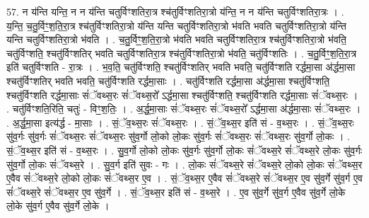 \documentclass[17pt]{extarticle}
\begin{document}
57. न य॑न्ति यन्ति॒ न न य॑न्ति चतुर्विꣳशतिरा॒त्र श्च॑तुर्विꣳशतिरा॒त्रो य॑न्ति॒ न न य॑न्ति चतुर्विꣳशतिरा॒त्रः । . य॒न्ति॒ च॒तु॒र्विꣳ॒॒श॒ति॒रा॒त्र श्च॑तुर्विꣳशतिरा॒त्रो य॑न्ति यन्ति चतुर्विꣳशतिरा॒त्रो भ॑वति भवति चतुर्विꣳशतिरा॒त्रो य॑न्ति यन्ति चतुर्विꣳशतिरा॒त्रो भ॑वति । . च॒तु॒र्विꣳ॒॒श॒ति॒रा॒त्रो भ॑वति भवति चतुर्विꣳशतिरा॒त्र श्च॑तुर्विꣳशतिरा॒त्रो भ॑वति॒ चतु॑र्विꣳशति॒ श्चतु॑र्विꣳशतिर् भवति चतुर्विꣳशतिरा॒त्र श्च॑तुर्विꣳशतिरा॒त्रो भ॑वति॒ चतु॑र्विꣳशतिः । . च॒तु॒र्विꣳ॒॒श॒ति॒रा॒त्र इति॑ चतुर्विꣳशति - रा॒त्रः । . भ॒व॒ति॒ चतु॑र्विꣳशति॒ श्चतु॑र्विꣳशतिर् भवति भवति॒ चतु॑र्विꣳशति रर्द्धमा॒सा अ॑र्द्धमा॒सा श्चतु॑र्विꣳशतिर् भवति भवति॒ चतु॑र्विꣳशति रर्द्धमा॒साः । . चतु॑र्विꣳशति रर्द्धमा॒सा अ॑र्द्धमा॒सा श्चतु॑र्विꣳशति॒ श्चतु॑र्विꣳशति रर्द्धमा॒साः सं॑ॅवथ्स॒रः सं॑ॅवथ्स॒रो᳚ ऽर्द्धमा॒सा श्चतु॑र्विꣳशति॒ श्चतु॑र्विꣳशति रर्द्धमा॒साः सं॑ॅवथ्स॒रः । . चतु॑र्विꣳशति॒रिति॒ चतुः॑ - विꣳ॒॒श॒तिः॒ । . अ॒र्द्ध॒मा॒साः सं॑ॅवथ्स॒रः सं॑ॅवथ्स॒रो᳚ ऽर्द्धमा॒सा अ॑र्द्धमा॒साः सं॑ॅवथ्स॒रः । . अ॒र्द्ध॒मा॒सा इत्य॑र्द्ध - मा॒साः । . सं॒ॅव॒थ्स॒रः सं॑ॅवथ्स॒रः । . सं॒ॅव॒थ्स॒र इति॑ सं - व॒थ्स॒रः । . सं॒ॅव॒थ्स॒रः सु॑व॒र्गः सु॑व॒र्गः सं॑ॅवथ्स॒रः सं॑ॅवथ्स॒रः सु॑व॒र्गो लो॒को लो॒कः सु॑व॒र्गः सं॑ॅवथ्स॒रः सं॑ॅवथ्स॒रः सु॑व॒र्गो लो॒कः । . सं॒ॅव॒थ्स॒र इति॑ सं - व॒थ्स॒रः । . सु॒व॒र्गो लो॒को लो॒कः सु॑व॒र्गः सु॑व॒र्गो लो॒कः सं॑ॅवथ्स॒रे सं॑ॅवथ्स॒रे लो॒कः सु॑व॒र्गः सु॑व॒र्गो लो॒कः सं॑ॅवथ्स॒रे । . सु॒व॒र्ग इति॑ सुवः - गः । . लो॒कः सं॑ॅवथ्स॒रे सं॑ॅवथ्स॒रे लो॒को लो॒कः सं॑ॅवथ्स॒र ए॒वैव सं॑ॅवथ्स॒रे लो॒को लो॒कः सं॑ॅवथ्स॒र ए॒व । . सं॒ॅव॒थ्स॒र ए॒वैव सं॑ॅवथ्स॒रे सं॑ॅवथ्स॒र ए॒व सु॑व॒र्गे सु॑व॒र्ग ए॒व सं॑ॅवथ्स॒रे सं॑ॅवथ्स॒र ए॒व सु॑व॒र्गे । . सं॒ॅव॒थ्स॒र इति॑ सं - व॒थ्स॒रे । . ए॒व सु॑व॒र्गे सु॑व॒र्ग ए॒वैव सु॑व॒र्गे लो॒के लो॒के सु॑व॒र्ग ए॒वैव सु॑व॒र्गे लो॒के । \newline
\end{document}
